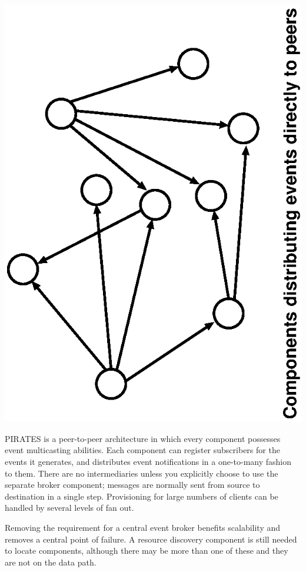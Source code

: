 \documentclass[12pt,a4paper,twoside]{article}
\renewcommand{\_}{\texttt{\symbol{95}}}
\begin{document}
\begin{center}
\includegraphics[scale=0.7,angle=-90]{diagrams/decentralised.eps}
\end{center}

PIRATES is a peer-to-peer architecture in which every component possesses
event multicasting abilities. Each component can register
subscribers for the events it generates, and distributes event
notifications in a one-to-many fashion to them. There are no
intermediaries unless you explicitly choose to use the separate broker
component; messages are normally sent from source
to destination in a single step. Provisioning for large numbers of
clients can be handled by several levels of fan out.

Removing the requirement for a central event broker benefits
scalability and removes a central point of failure. A resource
discovery component is still needed to locate components, although
there may be more than one of these and they are not on the data path.
\end{document}
